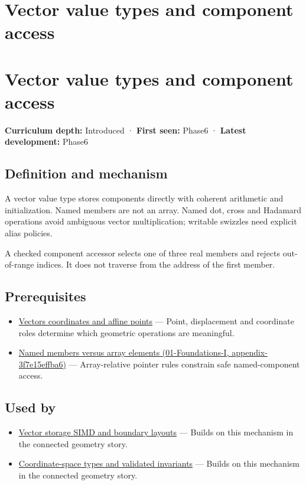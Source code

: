 \hypertarget{appendix-37a39984ba66}{}
\section*{Vector value types and component access}
\section{Vector value types and component access}\label{vector-value-types-and-component-access}

\textbf{Curriculum depth:} Introduced · \textbf{First seen:} Phase6 · \textbf{Latest development:} Phase6

\subsection{Definition and mechanism}\label{definition-and-mechanism}

A vector value type stores components directly with coherent arithmetic and initialization. Named members are not an array. Named dot, cross and Hadamard operations avoid ambiguous vector multiplication; writable swizzles need explicit alias policies.

A checked component accessor selects one of three real members and rejects out-of-range indices. It does not traverse from the address of the first member.

\subsection{Prerequisites}\label{prerequisites}

\begin{itemize}
\tightlist
\item
  \hyperref[appendix-0659864c0aa3]{Vectors coordinates and affine points} --- Point, displacement and coordinate roles determine which geometric operations are meaningful.
\item
  \href{}{Named members versus array elements (01-Foundations-I, appendix-3f7e15effba6)} --- Array-relative pointer rules constrain safe named-component access.
\end{itemize}

\subsection{Used by}\label{used-by}

\begin{itemize}
\tightlist
\item
  \hyperref[appendix-26bf6bf2fb8b]{Vector storage SIMD and boundary layouts} --- Builds on this mechanism in the connected geometry story.
\item
  \hyperref[appendix-380a220e2529]{Coordinate-space types and validated invariants} --- Builds on this mechanism in the connected geometry story.
\end{itemize}

